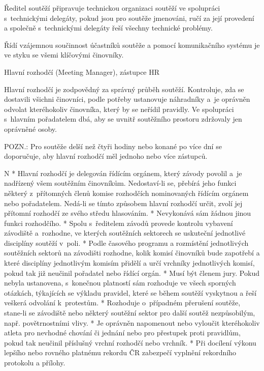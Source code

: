 Ředitel soutěží připravuje technickou organizaci soutěží ve spolupráci s~technickými delegáty, pokud jsou pro soutěže jmenováni, ručí za její provedení a společně s~technickými delegáty řeší všechny technické problémy.

Řídí vzájemnou součinnost účastníků soutěže a pomocí komunikačního systému je ve styku se všemi klíčovými činovníky.

\secc Hlavní rozhodčí (Meeting Manager), zástupce HR

Hlavní rozhodčí je zodpovědný za správný průběh soutěží.
Kontroluje, zda se dostavili všichni činovníci, podle potřeby ustanovuje náhradníky a~je oprávněn odvolat kteréhokoliv činovníka, který by se neřídil pravidly.
Ve spolupráci s~hlavním pořadatelem dbá, aby se uvnitř soutěžního prostoru zdržovaly jen oprávněné osoby.

POZN.: Pro soutěže delší než čtyři hodiny nebo konané po více dní se doporučuje, aby hlavní rozhodčí měl jednoho nebo více zástupců.

\begitems \style N 
* Hlavní rozhodčí je delegován řídícím orgánem, který závody povolil a~je nadřízený všem soutěžním činovníkům. Nedostaví-li se, přebírá jeho funkci některý z~přítomných členů komise rozhodčích nominovaných řídícím orgánem nebo pořadatelem. Nedá-li se tímto způsobem hlavní rozhodčí určit, zvolí jej přítomní rozhodčí ze svého středu hlasováním.
* Nevykonává sám žádnou jinou funkci rozhodčího.
* Spolu s~ředitelem závodů provede kontrolu vybavení závodiště a~rozhodne, ve kterých soutěžních sektorech se uskuteční jednotlivé disciplíny soutěží v~poli.
* Podle časového programu a rozmístění jednotlivých soutěžních sektorů na závodišti rozhodne, kolik komisí činovníků bude zapotřebí a které disciplíny jednotlivým komisím přidělí a určí vrchníky jednotlivých komisí, pokud tak již neučinil pořadatel nebo řídící orgán.
* Musí být členem jury. Pokud nebyla ustanovena, s~konečnou platností sám rozhoduje ve všech sporných otázkách, týkajících se výkladu pravidel, které se během soutěží vyskytnou a řeší veškerá odvolání k~protestům.
* Rozhoduje o~případném přerušení soutěže, stane-li se závodiště nebo některý soutěžní sektor pro další soutěž nezpůsobilým, např. povětrnostními vlivy.
* Je oprávněn napomenout nebo vyloučit kteréhokoliv atleta pro nevhodné chování či jednání nebo pro přestupek proti pravidlům, pokud tak neučinil příslušný vrchní rozhodčí nebo vrchník.
* Při docílení výkonu lepšího nebo rovného platnému rekordu ČR zabezpečí vyplnění rekordního protokolu a přílohy.

